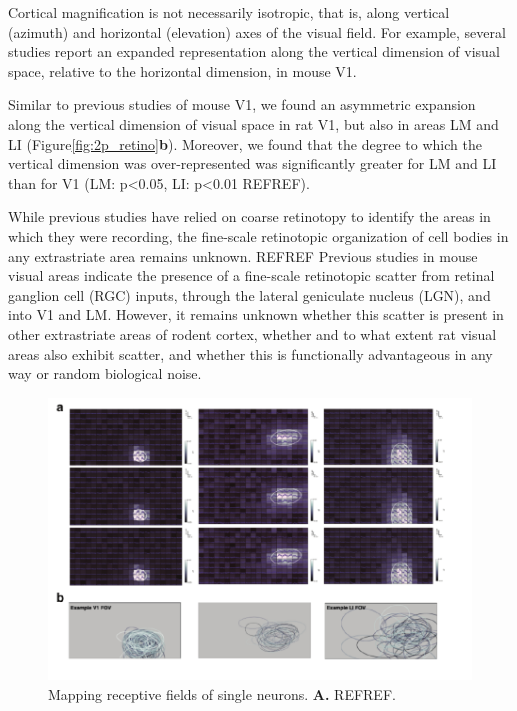Cortical magnification is not necessarily isotropic, that is, along vertical (azimuth) and horizontal (elevation) axes of the visual field. For example, several studies report an expanded representation along the vertical dimension of visual space, relative to the horizontal dimension, in mouse V1\cite{Garrett2014, Liang2018, Bonin2011}.  

Similar to previous studies of mouse V1, we found an asymmetric expansion along the vertical dimension of visual space in rat V1, but also in areas LM and LI (Figure\ref{fig:2p_retino}\textbf{b}). Moreover, we found that the degree to which the vertical dimension was over-represented was significantly greater for LM and LI than for V1 (LM: p<0.05, LI: p<0.01 REFREF).


While previous studies have relied on coarse retinotopy to identify the areas in which they were recording, the fine-scale retinotopic organization of cell bodies in any extrastriate area remains unknown. REFREF Previous studies in mouse visual areas indicate the presence of a fine-scale retinotopic scatter from retinal ganglion cell (RGC) inputs, through the lateral geniculate nucleus (LGN), and into V1 and LM\cite{Liang2018, Andermann2011, Marques2018}. However, it remains unknown whether this scatter is present in other extrastriate areas of rodent cortex, whether and to what extent rat visual areas also exhibit scatter, and whether this is functionally advantageous in any way or random biological noise.

\begin{figure}[t!]
    \includegraphics[width=\textwidth]{figures/chapter_3/rf_examples/rf_examples.pdf}
    \vspace{.1in}
    \caption[Receptive field mapping]{Mapping receptive fields of single neurons. \textbf{A.} REFREF.
    \label{fig:rf_examples}}
\end{figure}


